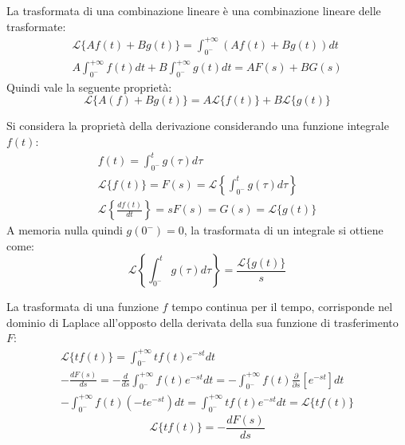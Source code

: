 \documentclass{article}
\numberwithin{equation}{subsection}
\begin{document}
La trasformata di una combinazione lineare è una combinazione lineare delle trasformate:
\begin{gather*}
    \mathcal{L}\{Af(t)+Bg(t)\}=\displaystyle\int_{0^-}^{+\infty}\left(Af(t)+Bg(t)\right)dt\\
    A\int_{0^-}^{+\infty}f(t)dt+B\int_{0^-}^{+\infty}g(t)dt=AF(s)+BG(s)
\end{gather*}
Quindi vale la seguente proprietà:
\begin{equation}
    \mathcal{L}\{A(f)+Bg(t)\}=A\mathcal{L}\{f(t)\}+B\mathcal{L}\{g(t)\}
\end{equation}

Si considera la proprietà della derivazione considerando una funzione integrale $f(t)$:
\begin{gather*}
    f(t)=\displaystyle\int_{0^-}^tg(\tau)d\tau\\
    \mathcal{L}\{f(t)\}=F(s)=\mathcal{L}\left\{\displaystyle\int_{0^-}^tg(\tau)d\tau\right\}\\
    \mathcal{L}\left\{\displaystyle\frac{df(t)}{dt}\right\}=sF(s)=G(s)=\mathcal{L}\{g(t)\}
\end{gather*}
A memoria nulla quindi $g(0^-)=0$, la trasformata di un integrale si ottiene come:
\begin{equation}
    \mathcal{L}\left\{\displaystyle\int_{0^-}^tg(\tau)d\tau\right\}=\frac{\mathcal{L}\{g(t)\}}{s}
\end{equation}



La trasformata di una funzione $f$ tempo continua per il tempo, corrisponde nel dominio di Laplace all'opposto della derivata della sua funzione di 
trasferimento $F$:
\begin{gather*}
    \mathcal{L}\{tf(t)\}=\displaystyle\int_{0^-}^{+\infty}tf(t)e^{-st}dt\\
    \displaystyle-\frac{dF(s)}{ds}=-\frac{d}{ds}\int_{0^-}^{+\infty}f(t)e^{-st}dt=-\int_{0^-}^{+\infty}f(t)\frac{\partial }{\partial s}\left[e^{-st}\right]dt\\
    -\int_{0^-}^{+\infty}f(t)(-te^{-st})dt=\int_{0^-}^{+\infty}tf(t)e^{-st}dt=\mathcal{L}\{tf(t)\}
\end{gather*}
\begin{equation}
    \mathcal{L}\{tf(t)\}=\displaystyle-\frac{dF(s)}{ds}
\end{equation}
\end{document}
